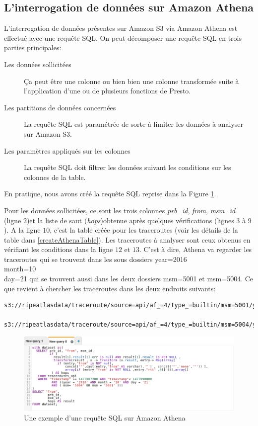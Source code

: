 \subsection{L'interrogation de données sur Amazon Athena} \label{sql-athena-request}

L'interrogation de données présentes sur Amazon S3 via Amazon Athena est effectué avec une requête SQL. On peut décomposer une requête SQL en trois parties principales:

\begin{description}
\item[Les données sollicitées] Ça peut être une colonne ou bien bien une colonne transformée suite à l'application d'une ou de plusieurs fonctions de Presto.
\item[Les partitions de données concernées] La requête SQL est paramétrée de sorte à limiter les données à analyser sur Amazon S3. 
\item[Les paramètres appliqués sur les colonnes] La requête SQL doit filtrer les données suivant les conditions sur les colonnes de la table.
\end{description}
En pratique, nous avons créé la requête SQL reprise dans la Figure \ref{fig:sqlrequestathena}. 


Pour les données sollicitées, ce sont les trois colonnes \textit{prb\_id}, \textit{from}, \textit{msm\_id} (ligne $2$)et la liste de saut (\textit{hops})obtenue après quelques vérifications (lignes $3$ à $9$). A la ligne $10$, c'est la table créée pour les traceroutes (voir les détails de la table dans \ref{createAthenaTable}). Les traceroutes à analyser sont ceux obtenus en vérifiant les conditions dans la ligne  $12$ et $13$. C'est à dire, Athena va regarder les traceroutes qui se trouvent dans les sous dossiers year=2016\\month=10\\day=21 qui se trouvent aussi dans les deux dossiers msm=5001 et msm=5004. Ce que revient à chercher les traceroutes dans les deux endroits suivants:

\begin{lstlisting}[basicstyle= \footnotesize]
s3://ripeatlasdata/traceroute/source=api/af_=4/type_=builtin/msm=5001/year=2016/month=10/day=21

s3://ripeatlasdata/traceroute/source=api/af_=4/type_=builtin/msm=5004/year=2016/month=10/day=21
\end{lstlisting}



\begin{figure}[H]
	\centering
	\includegraphics[width=1\linewidth]{illustrations/sqlRequestAthena.png}
	\caption{Une exemple d'une requête SQL sur Amazon Athena}
	\label{fig:sqlrequestathena}
\end{figure}


